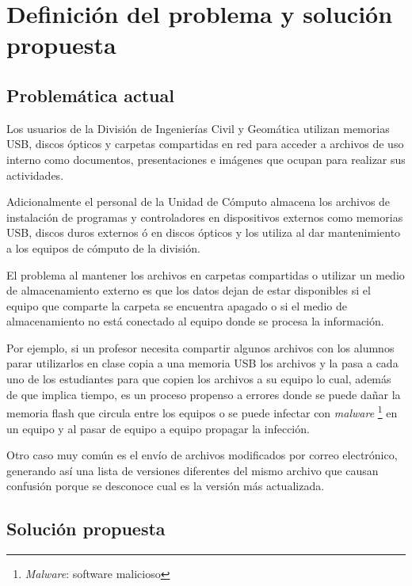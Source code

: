   \label{chap:cap2}
  \chapter {Definici\'{o}n del problema y soluci\'{o}n propuesta}

    \section {Problem\'{a}tica actual}

Los usuarios de la Divisi\'{o}n de Ingenier\'{i}as Civil y Geom\'{a}tica utilizan memorias \textsc{USB}, discos \'{o}pticos y carpetas compartidas en red para acceder a archivos de uso interno como documentos, presentaciones e im\'{a}genes que ocupan para realizar sus actividades.

Adicionalmente el personal de la Unidad de C\'{o}mputo almacena los archivos de instalaci\'{o}n de programas y controladores en dispositivos externos como memorias \textsc{USB}, discos duros externos \'{o} en discos \'{o}pticos y los utiliza al dar mantenimiento a los equipos de c\'{o}mputo de la divisi\'{o}n.

El problema al mantener los archivos en carpetas compartidas o utilizar un medio de almacenamiento externo es que los datos dejan de estar disponibles si el equipo que comparte la carpeta se encuentra apagado o si el medio de almacenamiento no est\'{a} conectado al equipo donde se procesa la informaci\'{o}n.

Por ejemplo, si un profesor necesita compartir algunos archivos con los alumnos parar utilizarlos en clase copia a una memoria \textsc{USB} los archivos y la pasa a cada uno de los estudiantes para que copien los archivos a su equipo lo cual, adem\'{a}s de que implica tiempo, es un proceso propenso a errores donde se puede da\~{n}ar la memoria flash que circula entre los equipos o se puede infectar con \textit{malware} \footnote{\textit{Malware}: software malicioso} en un equipo y al pasar de equipo a equipo propagar la infecci\'{o}n.

Otro caso muy com\'{u}n es el env\'{i}o de archivos modificados por correo electr\'{o}nico, generando as\'{i} una lista de versiones diferentes del mismo archivo que causan confusi\'{o}n porque se desconoce cual es la versi\'{o}n m\'{a}s actualizada.

    \section {Soluci\'{o}n propuesta}

